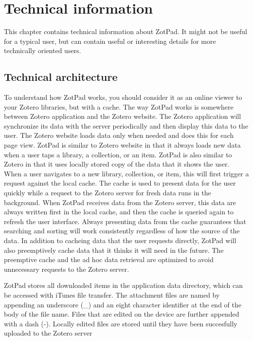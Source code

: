 \documentclass[oneside, openany, 12pt]{tufte-book}
\begin{document}
\chapter{Technical information}

This chapter contains technical information about ZotPad. It might not be useful for a typical user, but can contain useful or interesting details for more technically oriented users. 

	\section{Technical architecture}
\label{sect:architecture}

To understand how ZotPad works, you should consider it as an online viewer to your Zotero libraries, but with a cache. The way ZotPad works is somewhere between Zotero application and the Zotero website. The Zotero application will synchronize its data with the server periodically and then display this data to the user. The Zotero website loads data only when needed and does this for each page view. ZotPad is similar to Zotero website in that it always loads new data when a user taps a library, a collection, or an item. ZotPad is also similar to Zotero in that it uses locally stored copy of the data that it shows the user. When a user navigates to a new library, collection, or item, this will first trigger a request against the local cache. The cache is used to present data for the user quickly while a request to the Zotero server for fresh data runs in the background. When ZotPad receives data from the Zotero server, this data are always written first in the local cache, and then the cache is queried again to refresh the user interface. Always presenting data from the cache guarantees that searching and sorting will work consistently regardless of how the source of the data. In addition to cacheing data that the user requests directly, ZotPad will also preemptively cache data that it thinks it will need in the future. The preemptive cache and the ad hoc data retrieval are optimized to avoid unnecessary requests to the Zotero server. 

ZotPad stores all downloaded items in the application data directory, which can be accessed with iTunes file transfer. The attachment files are named by appending an underscore (\_) and an eight character identifier at the end of the body of the file name. Files that are edited on the device are further appended with a dash (-). Locally edited files are stored until they have been succesfully uploaded to the Zotero server
\end{document}
